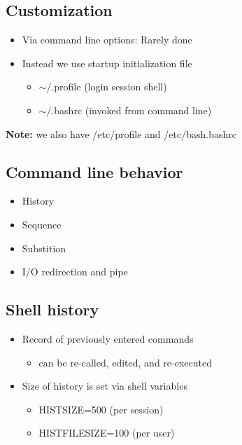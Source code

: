 \documentclass{report}
\begin{document}
    \bigbreak \noindent 
    \subsection{Customization}
    \begin{itemize}
        \item Via command line options: Rarely done
        \item Instead we use startup initialization file
            \begin{itemize}
                \item $\sim$/.profile (login session shell)
                \item $\sim$/.bashrc (invoked from command line)
            \end{itemize}
    \end{itemize}
    \textbf{Note:} we also have /etc/profile and /etc/bash.bashrc

    \bigbreak \noindent 
    \subsection{Command line behavior}
    \begin{itemize}
        \item History
        \item Sequence
        \item Substition
        \item I/O redirection and pipe
    \end{itemize}

    \bigbreak \noindent 
    \subsection{Shell history}
    \begin{itemize}
        \item Record of previously entered commands
            \begin{itemize}
                \item can be re-called, edited, and re-executed
            \end{itemize}
        \item Size of history is set via shell variables
            \begin{itemize}
                \item HISTSIZE=500 (per session)
                \item HISTFILESIZE=100 (per user)
            \end{itemize}
    \end{itemize}
    \bigbreak \noindent 
\end{document}

